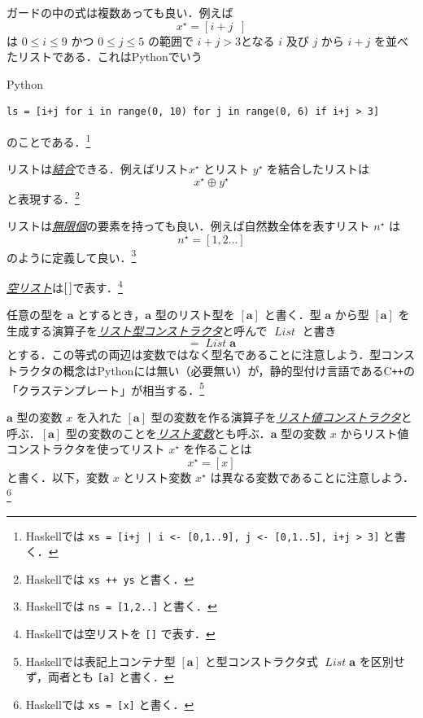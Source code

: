 \documentclass[a4paper]{jsbook}
\newcommand{\programminglanguage}[1]{\textsf{#1}}
\newcommand{\cxx}{\programminglanguage{C}\texttt{++}}
\newcommand{\haskell}{\programminglanguage{Haskell}}
\newcommand{\python}{\programminglanguage{Python}}
\newcommand{\keyword}[1]{{\underline{\emph{#1}}}}
\newcommand{\code}[1]{\texttt{#1}}
\newenvironment{pythoncode}{\begin{itembox}[r]{\python}}{\end{itembox}}
\newcommand{\mType}[1]{\mathbf{#1}}
\newcommand{\mListType}[1]{[\mType{#1}]}
\newcommand{\mTypeConstructor}[1]{\mathit{#1}} %
\newcommand{\mListWith}[1]{\left[#1\right]}
\newcommand{\mList}[1]{{#1}^\mathrm{\star}}
\newcommand{\mGuard}[1]{\mathop{\mid_{#1}}}
\DeclareMathOperator{\mAppend}{\oplus}
\DeclareMathOperator{\mFrom}{\in}
\DeclareMathOperator{\mListTypeConstructor}{\mTypeConstructor{List}}
\begin{document}
ガードの中の式は複数あっても良い．例えば
\begin{equation}
\mList{x}
=\mListWith{i+j\mGuard{i\mFrom\mListWith{0,1\dots9},\,j\mFrom\mListWith{0,1\dots5},\,i+j>3}}
\end{equation}
は $0\le i\le9$ かつ $0\le j\le5$ の範囲で $i+j>3$となる $i$ 及び $j$ から $i+j$ を並べたリストである．これは\python でいう
\begin{pythoncode}
\begin{verbatim}
ls = [i+j for i in range(0, 10) for j in range(0, 6) if i+j > 3]
\end{verbatim}
\end{pythoncode}
のことである．\footnote{\haskell では \code{xs = [i+j | i <- [0,1..9], j <- [0,1..5], i+j > 3]} と書く．}

リストは\keyword{結合}できる．例えばリスト$\mList{x}$ とリスト $\mList{y}$ を結合したリストは
\begin{equation}
\mList{x}\mAppend\mList{y}
\end{equation}
と表現する．\footnote{\haskell では \code{xs ++ ys} と書く．}

リストは\keyword{無限個}の要素を持っても良い．例えば自然数全体を表すリスト $\mList{n}$ は
\begin{equation}
\mList{n}=\mListWith{1,2\dots}
\end{equation}
のように定義して良い．\footnote{\haskell では \code{ns = [1,2..]} と書く．}

\keyword{空リスト}は${[\,]}$で表す．\footnote{\haskell では空リストを \code{[]} で表す．}

任意の型を $\mType{a}$ とするとき，$\mType{a}$ 型のリスト型を $\mListType{a}$ と書く．型 $\mType{a}$ から型 $\mListType{a}$ を生成する演算子を\keyword{リスト型コンストラクタ}と呼んで $\mListTypeConstructor$ と書き
\begin{equation}
\mListType{a}=\mListTypeConstructor\mType{a}
\end{equation}
とする．この等式の両辺は変数ではなく型名であることに注意しよう．型コンストラクタの概念は\python には無い（必要無い）が，静的型付け言語である\cxx の「クラステンプレート」が相当する．\footnote{\haskell では表記上コンテナ型 $\mListType{a}$ と型コンストラクタ式 $\mListTypeConstructor\mType{a}$ を区別せず，両者とも \code{[a]} と書く．}

$\mType{a}$ 型の変数 $x$ を入れた $\mListType{a}$ 型の変数を作る演算子を\keyword{リスト値コンストラクタ}と呼ぶ．$\mListType{a}$ 型の変数のことを\keyword{リスト変数}とも呼ぶ．$\mType{a}$ 型の変数 $x$ からリスト値コンストラクタを使ってリスト $\mList{x}$ を作ることは
\begin{equation}
\mList{x}=\mListWith{x}
\end{equation}
と書く．以下，変数 $x$ とリスト変数 $\mList{x}$ は異なる変数であることに注意しよう．\footnote{\haskell では \code{xs = [x]} と書く．}
\end{document}
